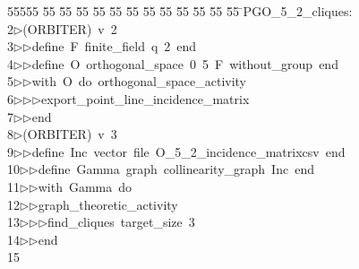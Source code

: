 %
%
\begin{tabbing}
55555 \= 55 \= 55 \= 55 \= 55 \= 55 \= 55 \= 55 \= 55 \= 55 \= 55 \= 55 \= 55 \= \>PGO\_5\_2\_cliques:\\[0pt]
2\>$\triangleright$\>(ORBITER)\ v\ 2\ \\[0pt]
3\>$\triangleright$\>$\triangleright$\>define\ F\ finite\_field\ q\ 2\ end\ \\[0pt]
4\>$\triangleright$\>$\triangleright$\>define\ O\ orthogonal\_space\ 0\ 5\ F\ without\_group\ end\ \\[0pt]
5\>$\triangleright$\>$\triangleright$\>with\ O\ do\ orthogonal\_space\_activity\ \\[0pt]
6\>$\triangleright$\>$\triangleright$\>$\triangleright$\>export\_point\_line\_incidence\_matrix\ \\[0pt]
7\>$\triangleright$\>$\triangleright$\>end\\[0pt]
8\>$\triangleright$\>(ORBITER)\ v\ 3\ \\[0pt]
9\>$\triangleright$\>$\triangleright$\>define\ Inc\ vector\ file\ O\_5\_2\_incidence\_matrixcsv\ end\ \\[0pt]
10\>$\triangleright$\>$\triangleright$\>define\ Gamma\ graph\ collinearity\_graph\ Inc\ end\ \\[0pt]
11\>$\triangleright$\>$\triangleright$\>with\ Gamma\ do\ \\[0pt]
12\>$\triangleright$\>$\triangleright$\>graph\_theoretic\_activity\ \\[0pt]
13\>$\triangleright$\>$\triangleright$\>$\triangleright$\>find\_cliques\ target\_size\ 3\ \\[0pt]
14\>$\triangleright$\>$\triangleright$\>end\\[0pt]
15\>\end{tabbing}
